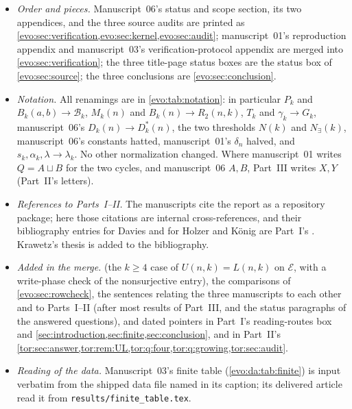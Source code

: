 \documentclass[11pt,a4paper]{article}
\numberwithin{equation}{section}
\theoremstyle{definition}
\theoremstyle{remark}
\newcommand{\Bip}{\mathcal B}
\begin{document}
\begin{itemize}
 printed as $17$, merged where they ask the same thing, with every source's
 comments kept; five are printed as answered (\cref{evo:q:oddcutoff,evo:q:evenexact,evo:q:evensecond,evo:q:rank} fully, the first part of \cref{evo:q:threshold}),
 and two carry partial answers (\cref{evo:q:stability,evo:q:growing}).
\item \emph{Order and pieces.} Manuscript~06's status and scope section, its
 two appendices, and the three source audits are printed as
 \cref{evo:sec:verification,evo:sec:kernel,evo:sec:audit}; manuscript~01's
 reproduction appendix and manuscript~03's verification-protocol appendix
 are merged into \cref{evo:sec:verification}; the three title-page status
 boxes are the status box of \cref{evo:sec:source}; the three conclusions
 are \cref{evo:sec:conclusion}.
\item \emph{Notation.} All renamings are in \cref{evo:tab:notation}: in
 particular $P_k$ and $B_k(a,b)\to\Bip_k$, $M_k(n)$ and $B_k(n)\to R_2(n,k)$,
 $T_k$ and $\gamma_k\to G_k$, manuscript~06's $D_k(n)\to D^*_k(n)$, the two
 thresholds $N(k)$ and $N_\exists(k)$, manuscript~06's constants hatted,
 manuscript~01's $\delta_n$ halved, and $s_k,\alpha_k,\lambda\to\lambda_k$.
 No other normalization changed. Where manuscript~01 writes $Q=A\sqcup B$ for
 the two cycles, and manuscript~06 $A,B$, Part~III writes $X,Y$ (Part~II's
 letters).
\item \emph{References to Parts~I--II.} The manuscripts cite the report as a
 repository package; here those citations are internal cross-references, and
 their bibliography entries for Davies and for Holzer and K\"onig are
 Part~I's \cite{Davies2017,HolzerKoenig2004}. Krawetz's thesis is added to
 the bibliography.
\item \emph{Added in the merge.}  (the $k\ge4$ case of
 $U(n,k)=L(n,k)$ on $\mathcal E$, with a write-phase check of the
 nonsurjective entry), the comparisons of \cref{evo:sec:rowcheck}, the
 sentences relating the three manuscripts to each other and to Parts~I--II
 (after most results of Part~III, and the status paragraphs of the answered
 questions), and dated pointers in Part~I's reading-routes box and
 \cref{sec:introduction,sec:finite,sec:conclusion}, and in Part~II's
 \cref{tor:sec:answer,tor:rem:UL,tor:q:four,tor:q:growing,tor:sec:audit}.
\item \emph{Reading of the data.} Manuscript~03's finite table
 (\cref{evo:da:tab:finite}) is input verbatim from the shipped data file
 named in its caption; its delivered article read it from
 \texttt{results/\allowbreak finite\_table.tex}.
\end{itemize}
\end{document}
